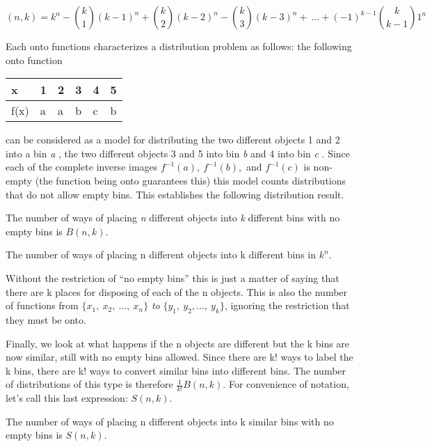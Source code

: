 \[
\left( n,k \right) = k^{n} - \binom{k}{1} \left( k - 1 \right)^{n} + \binom{k}{2} \left( k - 2 \right)^{n} - \binom{k}{3} \left( k - 3 \right)^{n} + \ \ldots + \left( - 1 \right)^{k - 1}\binom{k}{k - 1} 1^{n}
\]

Each onto functions characterizes a distribution problem as follows: the
following onto function
\begin{longtable}[]{@{}llllll@{}}
\toprule
x & 1 & 2 & 3 & 4 & 5\tabularnewline
\midrule
\endhead
f(x) & a & a & b & c & b\tabularnewline
\bottomrule

\end{longtable}

can be considered as a model for distributing the two different objects
1 and 2 into a bin \emph{a} , the two different objects 3 and 5 into bin
\emph{b} and 4 into bin \emph{c} . Since each of the complete inverse
images \(f^{- 1}\left( a \right),\ f^{- 1}\left( b \right),\) and
\(f^{- 1}(c)\) is non-empty (the function being onto guarantees this)
this model counts distributions that do not allow empty bins. This
establishes the following distribution result.

\begin{theorem}
	 The number of ways of placing \emph{n} different objects into
\emph{k} different bins with no empty bins is \(B(n,k)\).
\end{theorem}
\begin{theorem}
	 The number of ways of placing n different objects into k
different bins in \(k^{n}.\)
\end{theorem}
Without the restriction of ``no empty bins'' this is just a matter of
saying that there are k places for disposing of each of the n objects.
This is also the number of functions from
\(\{ x_{1},\ x_{2},\ \ldots,\ x_{n}\}\) \emph{to}
\(\{ y_{1},\ y_{2},\ldots,\ y_{k}\}\), ignoring the restriction that
they must be onto.

Finally, we look at what happens if the n objects are different but the
k bins are now similar, still with no empty bins allowed. Since there
are k! ways to label the k bins, there are k! ways to convert similar
bins into different bins. The number of distributions of this type is
therefore \(\frac{1}{k!}B(n,k)\). For convenience of notation, let's
call this last expression: \(S\left( n,k \right).\)

\begin{theorem}
	 The number of ways of placing n different objects into k similar
bins with no empty bins is \(S\left( n,k \right).\)
\end{theorem}

